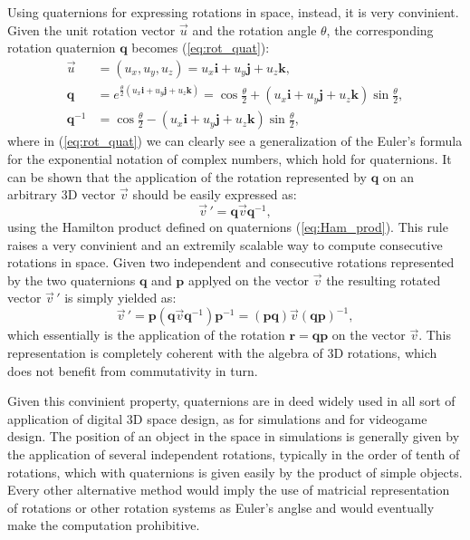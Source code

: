 Using quaternions for expressing rotations in space, instead, it is very convinient. Given the unit rotation vector $\vec u$ and the rotation angle $\theta$, the corresponding rotation quaternion $\bm{q}$ becomes (\ref{eq:rot_quat}):
\begin{align}
    \vec u & = (u_x, u_y, u_z) = u_x\bm{i} + u_y\bm{j} + u_z\bm{k}, \\
    \bm{q} & = e^{\frac{\theta}{2}(u_x\bm{i} + u_y\bm{j} + u_z\bm{k})} = \cos{\frac{\theta}{2}} + (u_x\bm{i} + u_y\bm{j} + u_z\bm{k})\sin{\frac{\theta}{2}}, \label{eq:rot_quat}\\
    \bm{q}^{-1} & = \cos{\frac{\theta}{2}} - (u_x\bm{i} + u_y\bm{j} + u_z\bm{k})\sin{\frac{\theta}{2}},
\end{align}
where in (\ref{eq:rot_quat}) we can clearly see a generalization of the Euler's formula for the exponential notation of complex numbers, which hold for quaternions. It can be shown that the application of the rotation represented by $\bm{q}$ on an arbitrary 3D vector $\vec v$ should be easily expressed as:
\begin{equation}
    \vec v\,' = \bm{q} \vec v \bm{q}^{-1},
\end{equation}
using the Hamilton product defined on quaternions (\ref{eq:Ham_prod}). This rule raises a very convinient and an extremily scalable way to compute consecutive rotations in space. Given two independent and consecutive rotations represented by the two quaternions $\bm{q}$ and $\bm{p}$ applyed on the vector $\vec v$ the resulting rotated vector $\vec v\,'$ is simply yielded as:
\begin{equation}
    \vec v\,' = \bm{p} ( \bm{q} \vec v \bm{q}^{-1} ) \bm{p}^{-1} = (\bm{p}\bm{q}) \vec v (\bm{q}\bm{p})^{-1},
\end{equation}
which essentially is the application of the rotation $\bm{r} = \bm{q}\bm{p}$ on the vector $\vec v$. This representation is completely coherent with the algebra of 3D rotations, which does not benefit from commutativity in turn.

Given this convinient property, quaternions are in deed widely used in all sort of application of digital 3D space design, as for simulations and for videogame design. The position of an object in the space in simulations is generally given by the application of several independent rotations, typically in the order of tenth of rotations, which with quaternions is given easily by the product of simple objects. Every other alternative method would imply the use of matricial representation of rotations or other rotation systems as Euler's anglse and would eventually make the computation prohibitive.

